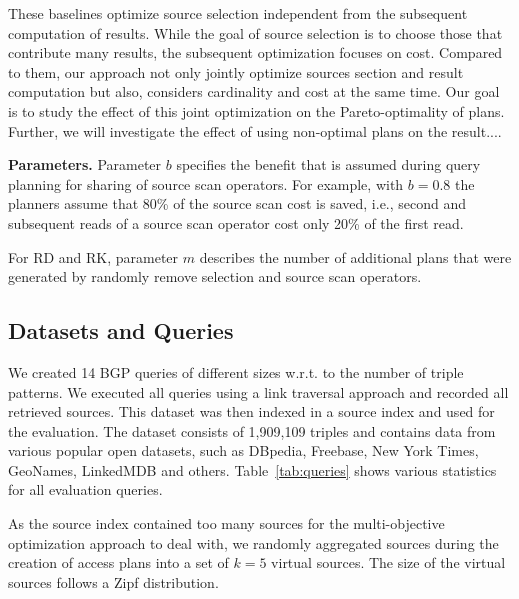 These baselines optimize source selection independent from the subsequent computation of results. While the goal of source selection is to choose those that contribute many results, the subsequent optimization focuses on cost. Compared to them, our approach not only jointly optimize sources section and result computation but also, considers cardinality and cost at the same time. Our goal is to study the effect of this joint optimization on the Pareto-optimality of plans. Further, we will investigate the effect of using non-optimal plans on the result....


\textbf{Parameters.} Parameter $b$ specifies the benefit that is
assumed during query planning for sharing of source scan
operators. For example, with $b=0.8$ the planners assume that 80\% of
the source scan cost is saved, i.e., second and subsequent reads of a
source scan operator cost only 20\% of the first read.

For RD and RK, parameter $m$ describes the number of additional plans
that were generated by randomly remove selection and source scan
operators.

\subsection{Datasets and Queries}

We created 14 BGP queries of different sizes w.r.t. to the number of
triple patterns. We executed all queries using a link traversal
approach and recorded all retrieved sources. This dataset was then
indexed in a source index and used for the evaluation. The dataset
consists of 1,909,109 triples and contains data from various popular
open datasets, such as DBpedia, Freebase, New York Times, GeoNames,
LinkedMDB and others. Table~\ref{tab:queries} shows various
statistics for all evaluation queries.

As the source index contained too many sources for the multi-objective
optimization approach to deal with, we randomly aggregated sources
during the creation of access plans into a set of $k=5$ virtual
sources. The size of the virtual sources follows a Zipf distribution.

